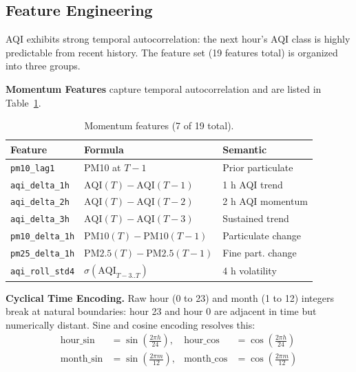 \documentclass[sigconf, nonacm]{acmart}
\begin{document}
\subsection{Feature Engineering}
\label{sec:features}

AQI exhibits strong temporal autocorrelation: the next
hour's AQI class is highly predictable from recent history.
The feature set (19 features total) is organized into three
groups.

\textbf{Momentum Features} capture temporal autocorrelation
and are listed in Table~\ref{tab:features}.

\begin{table}[h]
  \caption{Momentum features (7 of 19 total).}
  \label{tab:features}
  \small
  \begin{tabular}{@{}p{1.9cm}p{2.6cm}p{2.6cm}@{}}
    \toprule
    \textbf{Feature} & \textbf{Formula} & \textbf{Semantic} \\
    \midrule
    \texttt{pm10\_lag1}
      & PM10 at $T{-}1$
      & Prior particulate \\[2pt]
    \texttt{aqi\_delta\_1h}
      & $\mathrm{AQI}(T){-}\mathrm{AQI}(T{-}1)$
      & 1 h AQI trend \\[2pt]
    \texttt{aqi\_delta\_2h}
      & $\mathrm{AQI}(T){-}\mathrm{AQI}(T{-}2)$
      & 2 h AQI momentum \\[2pt]
    \texttt{aqi\_delta\_3h}
      & $\mathrm{AQI}(T){-}\mathrm{AQI}(T{-}3)$
      & Sustained trend \\[2pt]
    \texttt{pm10\_delta\_1h}
      & $\mathrm{PM10}(T){-}\mathrm{PM10}(T{-}1)$
      & Particulate change \\[2pt]
    \texttt{pm25\_delta\_1h}
      & $\mathrm{PM2.5}(T){-}\mathrm{PM2.5}(T{-}1)$
      & Fine part. change \\[2pt]
    \texttt{aqi\_roll\_std4}
      & $\sigma(\mathrm{AQI}_{T-3..T})$
      & 4 h volatility \\
    \bottomrule
  \end{tabular}
\end{table}

\textbf{Cyclical Time Encoding.}
Raw hour (0 to 23) and month (1 to 12) integers break at
natural boundaries: hour 23 and hour 0 are adjacent in time
but numerically distant.  Sine and cosine encoding resolves
this:
\begin{align}
  \mathrm{hour\_sin} &= \sin\!\left(\tfrac{2\pi h}{24}\right),
  &\mathrm{hour\_cos} &= \cos\!\left(\tfrac{2\pi h}{24}\right)\\
  \mathrm{month\_sin} &= \sin\!\left(\tfrac{2\pi m}{12}\right),
  &\mathrm{month\_cos} &= \cos\!\left(\tfrac{2\pi m}{12}\right)
\end{align}
\end{document}
